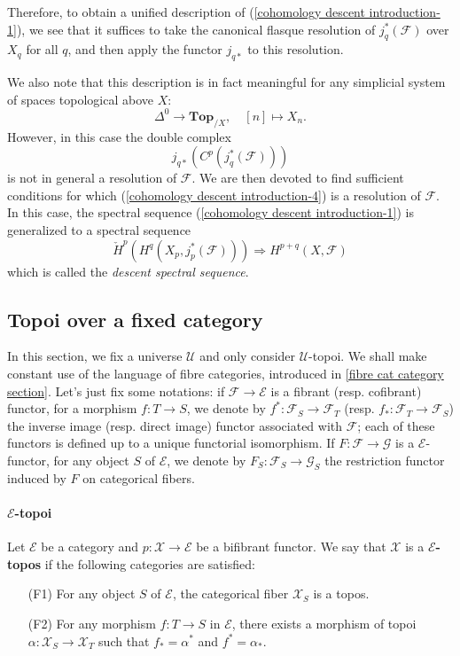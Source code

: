 Therefore, to obtain a unified description of (\ref{cohomology descent introduction-1}), we see that it suffices to take the canonical flasque resolution of $j_q^*(\mathscr{F})$ over $X_q$ for all $q$, and then apply the functor $j_{q*}$ to this resolution.\par
We also note that this description is in fact meaningful for any simplicial system of spaces topological above $X$:
\[\Delta^0\to \mathbf{Top}_{/X},\quad [n]\mapsto X_n.\]
However, in this case the double complex
\begin{equation}\label{cohomology descent introduction-4}
j_{q*}(C^p(j_q^*(\mathscr{F})))
\end{equation}
is not in general a resolution of $\mathscr{F}$. We are then devoted to find sufficient conditions for which (\ref{cohomology descent introduction-4}) is a resolution of $\mathscr{F}$. In this case, the spectral sequence (\ref{cohomology descent introduction-1}) is generalized to a spectral sequence
\begin{equation}\label{cohomology descent introduction-5}
\check{H}^p(H^q(X_p,j_p^*(\mathscr{F})))\Rightarrow H^{p+q}(X,\mathscr{F})
\end{equation}
which is called the \textit{descent spectral sequence}.

\subsection{Topoi over a fixed category}
In this section, we fix a universe $\mathscr{U}$ and only consider $\mathscr{U}$-topoi. We shall make constant use of the language of fibre categories, introduced in \autoref{fibre cat category section}. Let's just fix some notations: if $\mathcal{F}\to \mathcal{E}$ is a fibrant (resp. cofibrant) functor, for a morphism $f:T\to S$, we denote by $f^*:\mathcal{F}_S\to \mathcal{F}_T$ (resp. $f_*:\mathcal{F}_T\to \mathcal{F}_S$) the inverse image (resp. direct image) functor associated with $\mathcal{F}$; each of these functors is defined up to a unique functorial isomorphism. If $F:\mathcal{F}\to \mathcal{G}$ is a $\mathcal{E}$-functor, for any object $S$ of $\mathcal{E}$, we denote by $F_S:\mathcal{F}_S\to \mathcal{G}_S$ the restriction functor induced by $F$ on categorical fibers.

\paragraph{\texorpdfstring{$\mathcal{E}$}{E}-topoi}
Let $\mathcal{E}$ be a category and $p:\mathcal{X}\to \mathcal{E}$ be a bifibrant functor. We say that $\mathcal{X}$ is a \textbf{$\mathcal{E}$-topos} if the following categories are satisfied:
\begin{enumerate}[leftmargin=40pt]
\item[(F1)] For any object $S$ of $\mathcal{E}$, the categorical fiber $\mathcal{X}_S$ is a topos.
\item[(F2)] For any morphism $f:T\to S$ in $\mathcal{E}$, there exists a morphism of topoi $\alpha:\mathcal{X}_S\to \mathcal{X}_T$ such that $f_*=\alpha^*$ and $f^*=\alpha_*$.
\end{enumerate}

